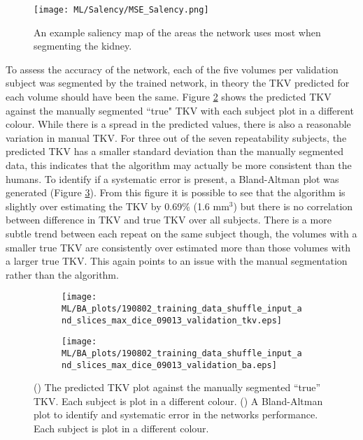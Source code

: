 \begin{figure}[H]
	\centering
	\texttt{[image: ML/Salency/MSE\_Salency.png]}
	\caption{An example saliency map of the areas the network uses most when segmenting the kidney.}
	\label{fig:ml_salency}	
\end{figure}

To assess the accuracy of the network, each of the five volumes per validation subject was segmented by the trained network, in theory the \ac{TKV} predicted for each volume should have been the same. Figure \ref{fig:ml_validation} shows the predicted \ac{TKV} against the manually segmented ``true" \ac{TKV} with each subject plot in a different colour. While there is a spread in the predicted values, there is also a reasonable variation in manual \ac{TKV}. For three out of the seven repeatability subjects, the predicted \ac{TKV} has a smaller standard deviation than the manually segmented data, this indicates that the algorithm may actually be more consistent than the humans. To identify if a systematic error is present, a Bland-Altman plot was generated (Figure \ref{fig:ml_ba_validation}). From this figure it is possible to see that the algorithm is slightly over estimating the \ac{TKV} by 0.69\% (1.6 mm$^3$) but there is no correlation between difference in \ac{TKV} and true \ac{TKV} over all subjects. There is a more subtle trend between each repeat on the same subject though, the volumes with a smaller true \ac{TKV} are consistently over estimated more than those volumes with a larger true \ac{TKV}. This again points to an issue with the manual segmentation rather than the algorithm.

\begin{figure}[H]
	\centering
	\begin{subfigure}[c]{0.47\textwidth}
		\centering
		\texttt{[image: ML/BA\_plots/190802\_training\_data\_shuffle\_input\_and\_slices\_max\_dice\_09013\_validation\_tkv.eps]}
		\caption{}
		\label{fig:ml_validation}
	\end{subfigure}
	\hfill
	\begin{subfigure}[c]{0.47\textwidth}
		\centering
		\texttt{[image: ML/BA\_plots/190802\_training\_data\_shuffle\_input\_and\_slices\_max\_dice\_09013\_validation\_ba.eps]}
		\caption{}
		\label{fig:ml_ba_validation}
	\end{subfigure}
	\caption{() The predicted \ac{TKV} plot against the manually segmented ``true'' \ac{TKV}. Each subject is plot in a different colour. () A Bland-Altman plot to identify and systematic error in the networks performance. Each subject is plot in a different colour.}
	\label{fig:ml_validation_tkv}
\end{figure}

